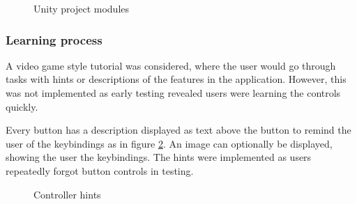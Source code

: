 \documentclass[a4paper]{report}
\begin{document}
\begin{figure}[h!]
    \centering

	\hfill
  \caption{Unity project modules}\label{structure}
  \small

\end{figure}

\subsubsection{Learning process}
A video game style tutorial was considered, where the user would go through tasks with hints or descriptions of the features in the application. However, this was not implemented as early testing revealed users were learning the controls quickly.

Every button has a description displayed as text above the button to remind the user of the keybindings as in figure \ref{hints}. An image can optionally be displayed, showing the user the keybindings. The hints were implemented as users repeatedly forgot button controls in testing.

\begin{figure}[h!]
    \centering
	\hfill
  \caption{Controller hints}\label{hints}
  \small
\end{figure}
\end{document}

